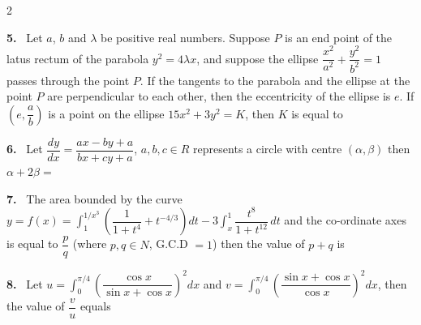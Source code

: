 \documentclass[10pt]{extarticle}
\newcommand{\qn}[1]{\par\smallskip\noindent\textbf{#1.}~}
\begin{document}
\begin{multicols}{2}
\qn{5} Let $a$, $b$ and $\lambda$ be positive real numbers. Suppose $P$ is an end point of the latus rectum of the parabola $y^2=4\lambda x$, and suppose the ellipse $\dfrac{x^2}{a^2}+\dfrac{y^2}{b^2}=1$ passes through the point $P$. If the tangents to the parabola and the ellipse at the point $P$ are perpendicular to each other, then the eccentricity of the ellipse is $e$. If $\left(e,\dfrac ab\right)$ is a point on the ellipse $15x^2+3y^2=K$, then $K$ is equal to \underline{\hspace{1.5cm}}
\qn{6} Let $\dfrac{dy}{dx}=\dfrac{ax-by+a}{bx+cy+a}$, $a,b,c\in R$ represents a circle with centre $(\alpha,\beta)$ then $\alpha+2\beta=$
\qn{7} The area bounded by the curve $y=f(x)=\displaystyle\int_1^{1/x^3}\left(\dfrac1{1+t^4}+t^{-4/3}\right)dt-3\int_x^1\dfrac{t^8}{1+t^{12}}\,dt$ and the co-ordinate axes is equal to $\dfrac pq$ (where $p,q\in N$, G.C.D $=1$) then the value of $p+q$ is
\qn{8} Let $u=\displaystyle\int_0^{\pi/4}\left(\dfrac{\cos x}{\sin x+\cos x}\right)^2dx$ and $v=\displaystyle\int_0^{\pi/4}\left(\dfrac{\sin x+\cos x}{\cos x}\right)^2dx$, then the value of $\dfrac vu$ equals
\end{multicols}
\end{document}
